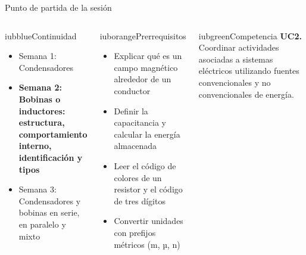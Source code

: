 \documentclass[aspectratio=169,11pt,xcolor={table}]{beamer}
\begin{document}
\begin{frame}{Punto de partida de la sesión}
\begin{columns}[T,onlytextwidth]
\begin{caja}[height=5.9cm]{iubblue}{Continuidad}
\scriptsize \begin{itemize}\setlength{\itemsep}{2pt}
  \item Semana 1: Condensadores
  \item \textbf{Semana 2: Bobinas o inductores: estructura, comportamiento interno, identificación y tipos}
  \item Semana 3: Condensadores y bobinas en serie, en paralelo y mixto
\end{itemize}
\end{caja}
\begin{caja}[height=5.9cm]{iuborange}{Prerrequisitos}
\scriptsize \begin{itemize}\setlength{\itemsep}{2pt}
  \item Explicar qué es un campo magnético alrededor de un conductor
  \item Definir la capacitancia y calcular la energía almacenada
  \item Leer el código de colores de un resistor y el código de tres dígitos
  \item Convertir unidades con prefijos métricos (m, µ, n)
\end{itemize}
\end{caja}
\begin{caja}[height=5.9cm]{iubgreen}{Competencia}
\scriptsize \textbf{UC2.} Coordinar actividades asociadas a sistemas eléctricos utilizando fuentes convencionales y no convencionales de energía.
\end{caja}
\end{columns}
\end{frame}
\end{document}
